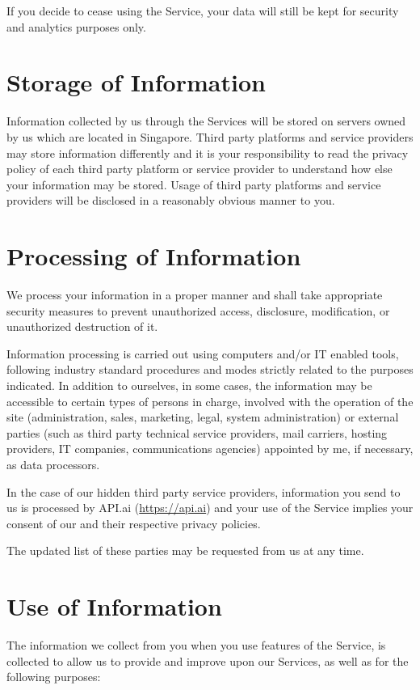 \documentclass[11pt]{article}
\begin{document}
If you decide to cease using the Service, your data will still be kept for security 
and analytics purposes only.

\section{Storage of Information}

Information collected by us through the Services will be stored on servers owned
by us which are located in Singapore. Third party platforms and service providers
may store information differently and it is your responsibility to read the privacy
policy of each third party platform or service provider to understand how else your 
information may be stored. Usage of third party platforms and service providers will
be disclosed in a reasonably obvious manner to you. 

\section{Processing of Information}

We process your information in a proper manner and shall take appropriate security
measures to prevent unauthorized access, disclosure, modification, or unauthorized
destruction of it.

Information processing is carried out using computers and/or IT enabled tools,
following industry standard procedures and modes strictly related to the purposes
indicated. In addition to ourselves, in some cases, the information may be accessible to
certain types of persons in charge, involved with the operation of the site
(administration, sales, marketing, legal, system administration) or external parties
(such as third party technical service providers, mail carriers, hosting providers,
IT companies, communications agencies) appointed by me, if necessary, as data
processors.

In the case of our hidden third party service providers, information you send to us 
is processed by API.ai (\url{https://api.ai}) and your use of the Service implies 
your consent of our and their respective privacy policies.

The updated list of these parties may be requested from us at any time.

\section{Use of Information}
The information we collect from you when you use features of the Service, is collected
to allow us to provide and improve upon our Services, as well as for the following
purposes:
\end{document}
